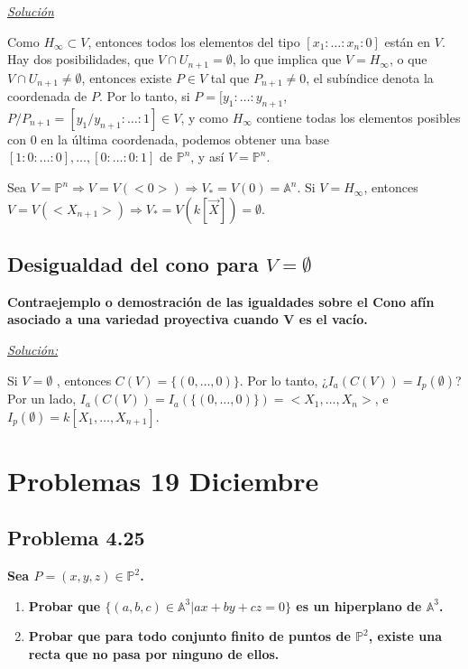 \underline{\textit{Solución}}

\vspace{2mm}

Como $H_\infty \subset V$, entonces todos los elementos del tipo $[x_1:\dots :x_n:0]$ están en $V$. Hay dos posibilidades, que $V\cap U_{n+1}=\emptyset $, lo que implica que $V=H_\infty$, o que $V\cap U_{n+1} \neq \emptyset $, entonces existe $P\in V$ tal que $P_{n+1}\neq 0$, el subíndice denota la coordenada de $P$. Por lo tanto, si $P=[y_1:\dots:y_{n+1}$, $P/P_{n+1}=[y_1/y_{n+1}:\dots : 1]\in V$, y como $H_\infty $ contiene todas los elementos posibles con 0 en la última coordenada, podemos obtener una base $[1:0:\dots:0],\dots , [0:\dots :0: 1]$ de $\mathbb{P}^n$, y así $V=\mathbb{P}^n$.

Sea $V=\mathbb{P}^n \Rightarrow V=V(<0>) \Rightarrow V_*=V(0)= \mathbb{A}^n$. Si $V=H_\infty $, entonces $V=V(<X_{n+1}>) \Rightarrow V_*=V(k[\vec{X}])=\emptyset $. 


\subsection{Desigualdad del cono para $V=\emptyset$}

\textbf{Contraejemplo o demostración de las igualdades sobre el Cono afín asociado a una variedad proyectiva cuando V es el vacío.}

\underline{\textit{Solución:}}

Si $V=\emptyset$ , entonces $C(V)=\{(0,\dots ,0)\}$. Por lo tanto, ¿$I_a(C(V))=I_p(\emptyset)$?
Por un lado, $I_a(C(V))=I_a(\{(0,\dots ,0)\})=<X_1,\dots, X_n>$, e $I_p(\emptyset )=k[X_1,\dots , X_{n+1}]$.

\section{Problemas 19 Diciembre}

\subsection{Problema 4.25}

\textbf{Sea $P=(x,y,z)\in \mathbb{P}^2$.}

\begin{enumerate}
\item \textbf{Probar que $\{(a,b,c)\in \mathbb{A}^3|ax+by+cz=0\}$ es un hiperplano de $\mathbb{A}^3$.}
\item \textbf{Probar que para todo conjunto finito de puntos de $\mathbb{P}^2$, existe una recta que no pasa por ninguno de ellos.}
\end{enumerate}


